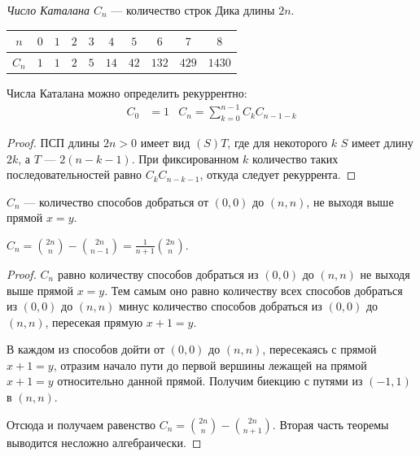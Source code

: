 \documentclass[12pt,a4paper]{article}
\begin{document}
    \begin{definition}
        \emph{Число Каталана $C_n$} --- количество строк Дика длины $2n$.

        \begin{table}[h]
            \centering
            \begin{tabular}{c|ccccccccc}
                $n$& $0$& $1$& $2$& $3$& $4$& $5$& $6$& $7$& $8$\\
                \hline
                $C_n$& $1$& $1$& $2$& $5$& $14$& $42$& $132$& $429$& $1430$
            \end{tabular}
        \end{table}
    \end{definition}

    \begin{statement}
        Числа Каталана можно определить рекуррентно:
        \begin{align*}
            C_0 &= 1&
            C_n = \sum_{k=0}^{n-1}C_k C_{n-1-k}
        \end{align*}
    \end{statement}

    \begin{proof}
        ПСП длины $2n > 0$ имеет вид $(S)T$, где для некоторого $k$ $S$ имеет длину $2k$, а $T$ --- $2(n-k-1)$. При фиксированном $k$ количество таких последовательностей равно $C_k C_{n-k-1}$, откуда следует рекуррента.
    \end{proof}

    \begin{remark}
        $C_n$ --- количество способов добраться от $(0, 0)$ до $(n, n)$, не выходя выше прямой $x=y$.
    \end{remark}

    \begin{theorem}
        $C_n = \binom{2n}{n} - \binom{2n}{n-1} = \frac{1}{n+1}\binom{2n}{n}$.
    \end{theorem}

    \begin{proof}
        $C_n$ равно количеству способов добраться из $(0, 0)$ до $(n, n)$ не выходя выше прямой $x=y$. Тем самым оно равно количеству всех способов добраться из $(0, 0)$ до $(n, n)$ минус количество способов добраться из $(0, 0)$ до $(n, n)$, пересекая прямую $x+1=y$.

        В каждом из способов дойти от $(0, 0)$ до $(n, n)$, пересекаясь с прямой $x+1=y$, отразим начало пути до первой вершины лежащей на прямой $x+1=y$ относительно данной прямой. Получим биекцию с путями из $(-1, 1)$ в $(n, n)$.

        Отсюда и получаем равенство $C_n = \binom{2n}{n} - \binom{2n}{n+1}$. Вторая часть теоремы выводится несложно алгебраически.
    \end{proof}
\end{document}
